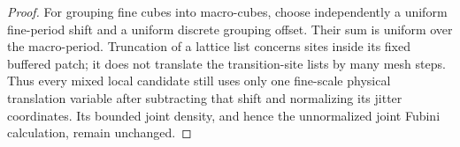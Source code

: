 \begin{proof}
For grouping fine cubes into macro-cubes, choose independently
a uniform fine-period shift and a uniform discrete grouping
offset.  Their sum is uniform over the macro-period.  Truncation
of a lattice list concerns sites inside its fixed buffered patch;
it does not translate the transition-site lists by many mesh
steps.  Thus every mixed local candidate still uses only one
fine-scale physical translation variable after subtracting that
shift and normalizing its jitter coordinates.  Its bounded joint
density, and hence the unnormalized joint Fubini calculation,
remain unchanged.
\end{proof}
